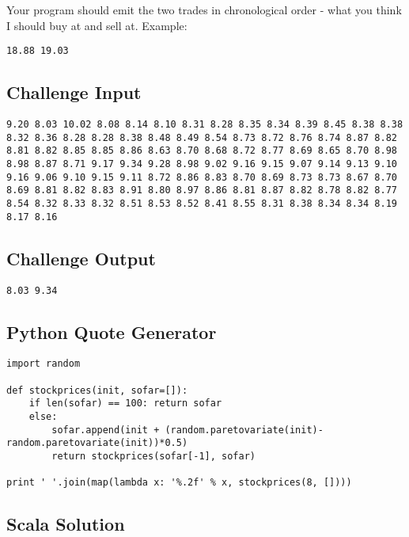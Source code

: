 Your program should emit the two trades in chronological order - what
you think I should buy at and sell at. Example:

\begin{verbatim}
18.88 19.03
\end{verbatim}

\subsection{Challenge Input}\label{challenge-input-7}

\begin{verbatim}
9.20 8.03 10.02 8.08 8.14 8.10 8.31 8.28 8.35 8.34 8.39 8.45 8.38 8.38 8.32 8.36 8.28 8.28 8.38 8.48 8.49 8.54 8.73 8.72 8.76 8.74 8.87 8.82 8.81 8.82 8.85 8.85 8.86 8.63 8.70 8.68 8.72 8.77 8.69 8.65 8.70 8.98 8.98 8.87 8.71 9.17 9.34 9.28 8.98 9.02 9.16 9.15 9.07 9.14 9.13 9.10 9.16 9.06 9.10 9.15 9.11 8.72 8.86 8.83 8.70 8.69 8.73 8.73 8.67 8.70 8.69 8.81 8.82 8.83 8.91 8.80 8.97 8.86 8.81 8.87 8.82 8.78 8.82 8.77 8.54 8.32 8.33 8.32 8.51 8.53 8.52 8.41 8.55 8.31 8.38 8.34 8.34 8.19 8.17 8.16
\end{verbatim}

\subsection{Challenge Output}\label{challenge-output-6}

\begin{verbatim}
8.03 9.34
\end{verbatim}

\subsection{Python Quote Generator}\label{python-quote-generator}

\begin{verbatim}
import random

def stockprices(init, sofar=[]): 
    if len(sofar) == 100: return sofar
    else:
        sofar.append(init + (random.paretovariate(init)-random.paretovariate(init))*0.5)
        return stockprices(sofar[-1], sofar)

print ' '.join(map(lambda x: '%.2f' % x, stockprices(8, [])))
\end{verbatim}

\subsection{Scala Solution}\label{scala-solution-8}

